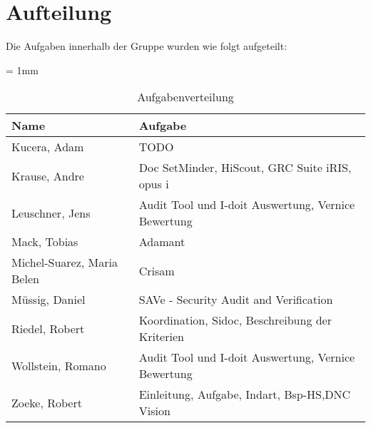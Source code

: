\section*{Aufteilung}
Die Aufgaben innerhalb der Gruppe wurden wie folgt aufgeteilt:

\begin{table}[H]
	\sffamily
	\caption{Aufgabenverteilung}
	\tabulinesep = 1mm %
	\centering
		\begin{tabu} to 0.9\textwidth { X[1.7]  X[3] }
		\hline
		\textbf{Name} & \textbf{Aufgabe}\\
		\hline 
		Kucera, Adam & TODO\\

		Krause, Andre & Doc SetMinder, HiScout, GRC Suite iRIS, opus i\\

		Leuschner, Jens & Audit Tool und I-doit Auswertung, Vernice Bewertung \\

		Mack, Tobias & Adamant\\

		Michel-Suarez, Maria Belen & Crisam\\

		Müssig, Daniel & SAVe - Security Audit and Verification\\

		Riedel, Robert & Koordination, Sidoc, Beschreibung der Kriterien\\

		Wollstein, Romano & Audit Tool und I-doit Auswertung, Vernice Bewertung\\

		Zoeke, Robert & Einleitung, Aufgabe, Indart, Bsp-HS,DNC Vision\\

	\end{tabu}
\end{table}
